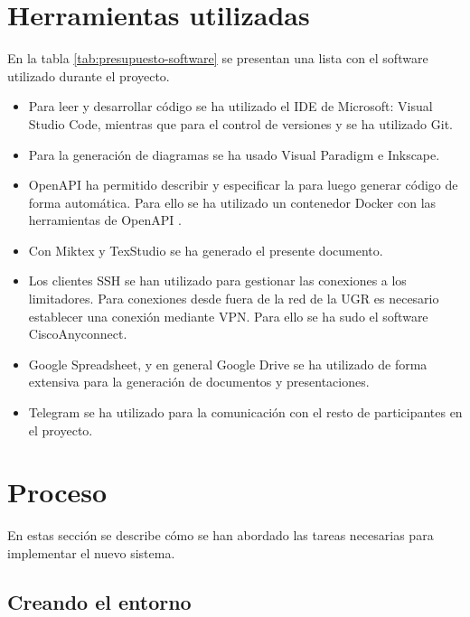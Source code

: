 \section{Herramientas utilizadas}

En la tabla \ref{tab:presupuesto-software} se presentan una lista con el software utilizado durante el proyecto.

\begin{itemize}
	\item Para leer y desarrollar código se ha utilizado el \acrshort{IDE} de Microsoft: Visual Studio Code, mientras que para el control de versiones y se ha utilizado Git.

	\item Para la generación de diagramas se ha usado Visual Paradigm e Inkscape.

	\item OpenAPI \cite{openapi} ha permitido describir y especificar la  para luego generar código de forma automática. Para ello se ha utilizado un contenedor Docker con las herramientas de OpenAPI \cite{openapi}.

	\item Con Miktex y TexStudio se ha generado el presente documento.

	\item Los clientes \acrshort{SSH} se han utilizado para gestionar las conexiones a los limitadores. Para conexiones desde fuera de la red de la \acrshort{UGR} es necesario establecer una conexión mediante \acrshort{VPN}. Para ello se ha sudo el software CiscoAnyconnect.

	\item Google Spreadsheet, y en general Google Drive se ha utilizado de forma extensiva para la generación de documentos y presentaciones.

	\item Telegram se ha utilizado para la comunicación con el resto de participantes en el proyecto.
\end{itemize}

\section{Proceso}

En estas sección se describe cómo se han abordado las tareas necesarias para implementar el nuevo sistema.

\subsection{Creando el entorno}

